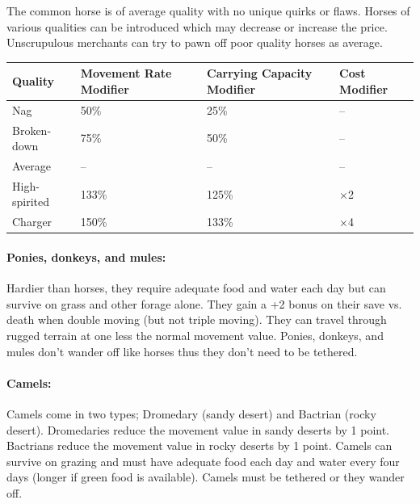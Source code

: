 \begin{multicols}{2}
The common horse is of average quality with no unique quirks or flaws.  Horses of various qualities can be introduced which may decrease or increase the price.  Unscrupulous merchants can try to pawn off poor quality horses as average.

\noindent
\begin{minipage}{\columnwidth}

\label{horsequality}
\noindent
\begin{tabular}{|p{}|p{}|p{}|p{}|}
\hline
Quality	& Movement Rate Modifier	& Carrying Capacity Modifier	& Cost Modifier \\
\hline\hline
\rowcolor[gray]{.9}Nag				& 50\%	& 25\%	& -- \\
Broken-down		& 75\%	& 50\%	& -- \\
\rowcolor[gray]{.9}Average			& --	& --	& -- \\
High-spirited	& 133\%	& 125\%	& $\times$2 \\
\rowcolor[gray]{.9}Charger			& 150\%	& 133\%	& $\times$4 \\
\hline
\end{tabular}

\end{minipage}

\paragraph{Ponies, donkeys, and mules:} Hardier than horses, they require adequate food and water each day but can survive on grass and other forage alone.  They gain a +2 bonus on their save vs. death when double moving (but not triple moving).  They can travel through rugged terrain at one less the normal movement value.  Ponies, donkeys, and mules don't wander off like horses thus they don't need to be tethered.

\paragraph{Camels:} Camels come in two types; Dromedary (sandy desert) and Bactrian (rocky desert).  Dromedaries reduce the movement value in sandy deserts by 1 point.  Bactrians reduce the movement value in rocky deserts by 1 point.  Camels can survive on grazing and must have adequate food each day and water every four days (longer if green food is available).  Camels must be tethered or they wander off.


\end{multicols}
